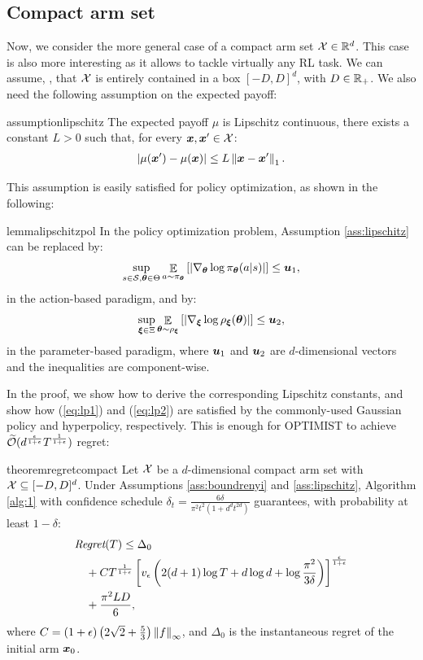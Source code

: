 \documentclass{article}
\makeatletter
\DeclareRobustCommand{\algoname}{OPTIMIST\@\xspace}
\makeatother
\begin{document}
\subsection{Compact arm set}
Now, we consider the more general case of a compact arm set $\Xspace\in\Reals^d$. This case is also more interesting as it allows to tackle virtually any RL task. We can assume, \wlg, that $\Xspace$ is entirely contained in a box $[-D,D]^d$, with $D\in\Reals_{+}$. We also need the following assumption on the expected payoff:
%
\begin{restatable}{assumption}{lipschitz}\label{ass:lipschitz}
	The expected payoff $\mu$ is Lipschitz continuous, \ie there exists a constant $L>0$ such that, for every $\vx, \vx'\in\Xspace$:
	\begin{align*}
		|\mu(\vx') - \mu(\vx)| \leq L\norm[1]{\vx - \vx'}.
	\end{align*}
\end{restatable}
%
This assumption is easily satisfied for policy optimization, as shown in the following:
%
\begin{restatable}{lemma}{lipschitzpol}\label{lem:lispschitzpol}
	In the policy optimization problem, Assumption \ref{ass:lipschitz} can be replaced by:
	\begin{align}\label{eq:lp1}
		\sup_{s\in\Sspace,\vtheta\in\Theta}\Exp_{a\sim\pi_{\vtheta}}
		\left[\left|\nabla_{\vtheta}\log\pi_{\vtheta}(a|s)\right|\right] \leq \vu_1,
	\end{align}
	in the action-based paradigm, and by:
	\begin{align}\label{eq:lp2}
		\sup_{\vxi\in\Xi}\Exp_{\vtheta\sim\rho_{\vxi}}
		\left[\left|\nabla_{\vxi}\log\rho_{\vxi}(\vtheta)\right|\right] \leq \vu_2,
	\end{align}
	in the parameter-based paradigm, where $\vu_1$ and $\vu_2$ are $d$-dimensional vectors and the inequalities are component-wise.
\end{restatable}
%
In the proof, we show how to derive the corresponding Lipschitz constants, and show how (\ref{eq:lp1}) and (\ref{eq:lp2}) are satisfied by the commonly-used Gaussian policy and hyperpolicy, respectively. This is enough for \algoname to achieve $\wt{\mathcal{O}}(d^{\frac{\epsilon}{1+\epsilon}}T^{\frac{1}{1+\epsilon}})$ regret:
%
\begin{restatable}{theorem}{regretcompact}\label{th:regretcompact}
	Let $\Xspace$ be a $d$-dimensional compact arm set with $\Xspace \subseteq [-D,D]^d$. Under Assumptions \ref{ass:boundrenyi} and \ref{ass:lipschitz}, Algorithm \ref{alg:1} with confidence schedule $\delta_t = \frac{6\delta}{\pi^2t^2(1+d^dt^{2d})}$ guarantees, with probability at least $1-\delta$:
	\begin{align*}
	&\Reg(T) \leq \Delta_0 \\
	&\quad+ 	C
	T^{\frac{1}{1+\epsilon}}
	\left[v_{\epsilon}
	\left(2(d+1)\log T + d\log d + \log \frac{\pi^2}{3\delta}\right)
	\right]^{\frac{\epsilon}{1+\epsilon}} \\
	&\quad+ \frac{\pi^2LD}{6},
	\end{align*}
	where $C=(1+\epsilon)\left(2\sqrt{2}+\frac{5}{3}\right)\norm[\infty]{f}$, and $\Delta_0$ is the instantaneous regret of the initial arm $\vx_0$.
\end{restatable}
\end{document}
